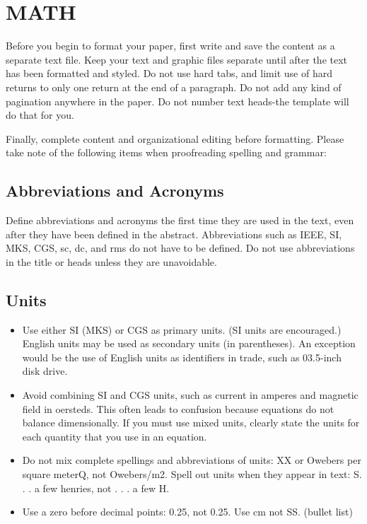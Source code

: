 \documentclass[letterpaper, 10 pt, conference]{ieeeconf}  %
\begin{document}
	\section{MATH}
	
	Before you begin to format your paper, first write and save the content as a separate text file. Keep your text and graphic files separate until after the text has been formatted and styled. Do not use hard tabs, and limit use of hard returns to only one return at the end of a paragraph. Do not add any kind of pagination anywhere in the paper. Do not number text heads-the template will do that for you.
	
	Finally, complete content and organizational editing before formatting. Please take note of the following items when proofreading spelling and grammar:
	
	\subsection{Abbreviations and Acronyms} Define abbreviations and acronyms the first time they are used in the text, even after they have been defined in the abstract. Abbreviations such as IEEE, SI, MKS, CGS, sc, dc, and rms do not have to be defined. Do not use abbreviations in the title or heads unless they are unavoidable.
	
	\subsection{Units}
	
	\begin{itemize}
		
		\item Use either SI (MKS) or CGS as primary units. (SI units are encouraged.) English units may be used as secondary units (in parentheses). An exception would be the use of English units as identifiers in trade, such as 03.5-inch disk drive.
		\item Avoid combining SI and CGS units, such as current in amperes and magnetic field in oersteds. This often leads to confusion because equations do not balance dimensionally. If you must use mixed units, clearly state the units for each quantity that you use in an equation.
		\item Do not mix complete spellings and abbreviations of units: XX or Owebers per square meterQ, not Owebers/m2.  Spell out units when they appear in text: S. . . a few henries, not . . . a few H.
		\item Use a zero before decimal points: 0.25, not 0.25. Use cm not SS. (bullet list)
		
	\end{itemize}
	
\end{document}
